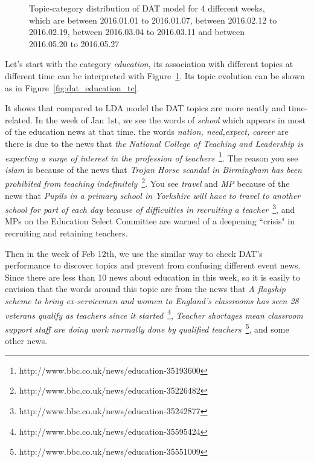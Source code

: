 \begin{figure}[!t]
\caption{\small Topic-category distribution of DAT model for 4 different weeks, which are between 2016.01.01 to 2016.01.07, between 2016.02.12 to 2016.02.19, between 2016.03.04 to 2016.03.11 and between 2016.05.20 to 2016.05.27}
\label{fig:dattopiccategory}
\end{figure}

Let's start with the category \textit{education}, its association with different topics at different time can be interpreted with Figure~\ref{fig:dattopiccategory}. Its topic evolution can be shown as in Figure~\ref{fig:dat_education_tc}.

It shows that compared to LDA model the DAT topics are more neatly and time-related. In the week of Jan 1st, we see the words of \textit{school} which appears in most of the education news at that time. the words \textit{nation, need,expect, career} are there is due to the news that \textit{the National College of Teaching and Leadership is expecting a surge of interest in the profession of teachers}~\footnote{http://www.bbc.co.uk/news/education-35193600}. The reason you see \textit{islam} is because of the news that \textit{Trojan Horse scandal in Birmingham has been prohibited from teaching indefinitely}~\footnote{http://www.bbc.co.uk/news/education-35226482}. You see \textit{travel} and \textit{MP} because of the news that \textit{Pupils in a primary school in Yorkshire will have to travel to another school for part of each day because of difficulties in recruiting a teacher}~\footnote{http://www.bbc.co.uk/news/education-35242877}, and MPs on the Education Select Committee are warned of a deepening ``crisis" in recruiting and retaining teachers.

Then in the week of Feb 12th, we use the similar way to check DAT's performance to discover topics and prevent from confusing different event news. Since there are less than 10 news about education in this week, so it is easily to envision that the words around this topic are from the news that \textit{A flagship scheme to bring ex-servicemen and women to England's classrooms has seen 28 veterans qualify as teachers since it started}~\footnote{http://www.bbc.co.uk/news/education-35595424}, \textit{Teacher shortages mean classroom support staff are doing work normally done by qualified teachers}~\footnote{http://www.bbc.co.uk/news/education-35551009}, and some other news. 

